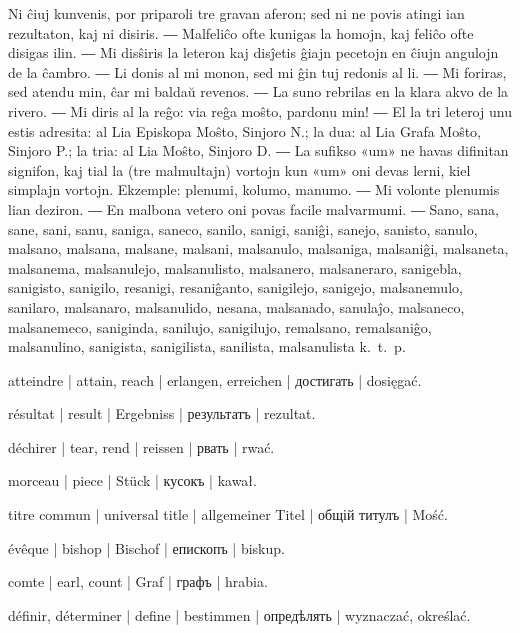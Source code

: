 Ni ĉiuj kunvenis, por priparoli tre gravan aferon; sed ni ne povis atingi ian rezultaton, kaj ni disiris. ― Malfeliĉo ofte kunigas la homojn, kaj feliĉo ofte disigas ilin. ― Mi disŝiris la leteron kaj disĵetis ĝiajn pecetojn en ĉiujn angulojn de la ĉambro. ― Li donis al mi monon, sed mi ĝin tuj redonis al li. ― Mi foriras, sed atendu min, ĉar mi baldaŭ revenos. ― La suno rebrilas en la klara akvo de la rivero. ― Mi diris al la reĝo: via reĝa moŝto, pardonu min! ― El la tri leteroj unu estis adresita: al Lia Episkopa Moŝto, Sinjoro N.; la dua: al Lia Grafa Moŝto, Sinjoro P.; la tria: al Lia Moŝto, Sinjoro D. ― La sufikso «um» ne havas difinitan signifon, kaj tial la (tre malmultajn) vortojn kun «um» oni devas lerni, kiel simplajn vortojn. Ekzemple: plenumi, kolumo, manumo. ― Mi volonte plenumis lian deziron. ― En malbona vetero oni povas facile malvarmumi. ― Sano, sana, sane, sani, sanu, saniga, saneco, sanilo, sanigi, saniĝi, sanejo, sanisto, sanulo, malsano, malsana, malsane, malsani, malsanulo, malsaniga, malsaniĝi, malsaneta, malsanema, malsanulejo, malsanulisto, malsanero, malsaneraro, sanigebla, sanigisto, sanigilo, resanigi, resaniĝanto, sanigilejo, sanigejo, malsanemulo, sanilaro, malsanaro, malsanulido, nesana, malsanado, sanulaĵo, malsaneco, malsanemeco, saniginda, sanilujo, sanigilujo, remalsano, remalsaniĝo, malsanulino, sanigista, sanigilista, sanilista, malsanulista k.~t.~p.

\begin{ekzvocab}{1em}
 atteindre | attain, reach | erlangen, erreichen | достигать | dosięgać.

 résultat | result | Ergebniss | результатъ | rezultat.

 déchirer | tear, rend | reissen | рвать | rwać.

 morceau | piece | Stück | кусокъ | kawał.

 titre commun | universal title | allgemeiner Titel | общій титулъ | Mość.

\begin{minipage}{\textwidth}
 évêque | bishop | Bischof | епископъ | biskup.

 comte | earl, count | Graf | графъ | hrabia.

 définir, déterminer | define | bestimmen | опредѣлять | wyznaczać, określać.
\end{minipage}
\end{ekzvocab}



